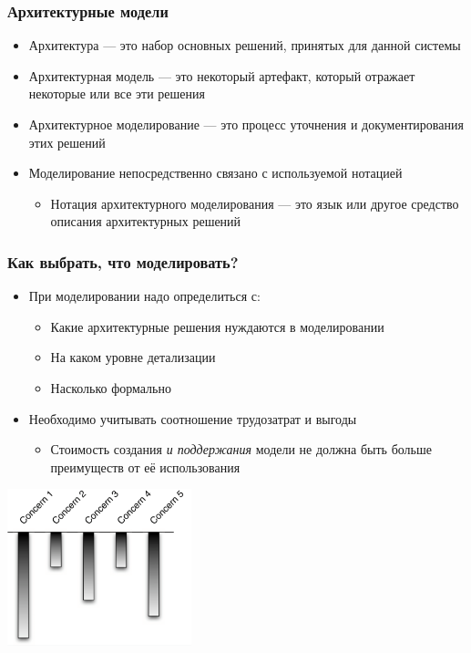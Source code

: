 \documentclass{../mcsslides}
\begin{document}
    \begin{frame}
        \frametitle{Архитектурные модели}
        \begin{itemize}
            \item Архитектура --- это набор основных решений, принятых для данной системы
            \item Архитектурная модель --- это некоторый артефакт, который отражает некоторые или все эти решения
            \item Архитектурное моделирование --- это процесс уточнения и документирования этих решений
            \item Моделирование непосредственно связано с используемой нотацией
            \begin{itemize}
                \item Нотация архитектурного моделирования --- это язык или другое средство описания архитектурных решений
            \end{itemize}
        \end{itemize}
    \end{frame}

    \begin{frame}
        \frametitle{Как выбрать, что моделировать?}
        \begin{itemize}
            \item При моделировании надо определиться с:
            \begin{itemize}
                \item Какие архитектурные решения нуждаются в моделировании
                \item На каком уровне детализации
                \item Насколько формально
            \end{itemize}
            \item Необходимо учитывать соотношение трудозатрат и выгоды
            \begin{itemize}
                \item Стоимость создания \textit{и поддержания} модели не должна быть больше преимуществ от её использования
            \end{itemize}
        \end{itemize}
        \begin{center}
            \includegraphics[width=0.4\textwidth]{concerns.png}
        \end{center}
    \end{frame}
\end{document}
